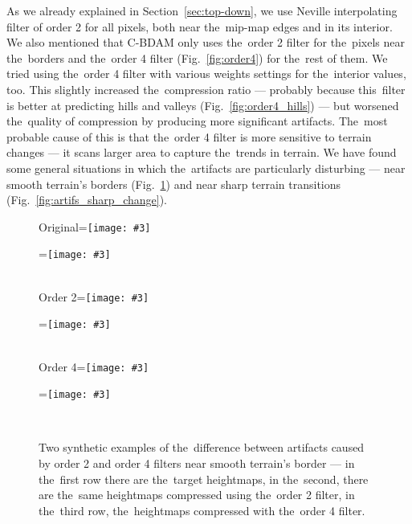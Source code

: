 As we already explained in Section~\ref{sec:top-down}, we use Neville interpolating filter of order 2 for all pixels, both near the~mip-map edges and in its interior. We also mentioned that C-BDAM only uses the~order 2 filter for the~pixels near the~borders and the~order 4 filter (Fig.~\ref{fig:order4}) for the~rest of them. We tried using the~order 4 filter with various weights settings for the~interior values, too. This slightly increased the~compression ratio --- probably because this~filter is better at predicting hills and valleys (Fig.~\ref{fig:order4_hills}) --- but worsened the~quality of compression by producing more significant artifacts. The~most probable cause of this is that the~order 4 filter is more sensitive to terrain changes --- it scans larger area to capture the~trends in terrain. We have found some general situations in which the~artifacts are particularly disturbing --- near smooth terrain's borders (Fig.~\ref{fig:artifs_border}) and near sharp terrain transitions (Fig.~\ref{fig:artifs_sharp_change}). 

\newcommand{\vcentered}[1]{\begingroup\setbox0=\hbox{#1}\parbox{\wd0}{\box0}\endgroup}

\newcommand{\artifWidth}{160}
\newcommand{\artifHeight}{120}
\newcommand{\incimg}[3]{\texttt{[image: \#3]}}
\newcommand{\incimgvcenter}[3]{\vcentered{\incimg{#1}{#2}{#3}}}
\newcommand{\incartifborder}[1]{\incimgvcenter{\artifWidth}{\artifHeight}{#1}}
\newcommand{\hspacehead}{\hspace{0.4cm}}

\begin{figure}
	\begin{center}
	Original\hspacehead\incartifborder{figures/artif_orig0.png} 
	\incartifborder{figures/artif_orig1.png} \\  
	Order 2\hspacehead\incartifborder{figures/artif_four0.png} 
	\incartifborder{figures/artif_four1.png} \\ 
	Order 4\hspacehead\incartifborder{figures/artif_twelve0.png} 
	\incartifborder{figures/artif_twelve1.png} \\ 
	\end{center}
	\caption{Two synthetic examples of the~difference between artifacts caused by order 2 and order 4 filters near smooth terrain's border --- in the~first row there are the~target heightmaps, in the~second, there are the~same heightmaps compressed using the~order 2 filter, in the~third row, the~heightmaps compressed with the~order 4 filter.}
	\label{fig:artifs_border}
\end{figure}

